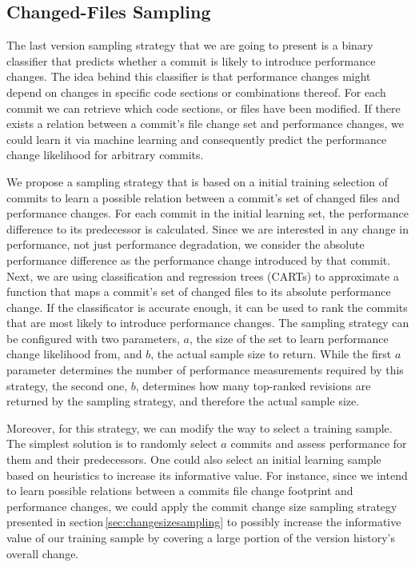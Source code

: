 \subsection{Changed-Files Sampling}\label{sec:changedfiles}
The last version sampling strategy that we are going to present is a binary
classifier that predicts whether a commit is likely to introduce performance
changes. The idea behind this classifier is that performance changes might
depend on changes in specific code sections or combinations thereof. For each
commit we can retrieve which code sections, or files have been modified. If
there exists a relation between a commit’s file change set and performance
changes, we could learn it via machine learning and consequently predict
the performance change likelihood for arbitrary commits.

We propose a sampling strategy that is based on a initial training selection of
commits to learn a possible relation between a commit’s set of changed files
and performance changes. For each commit in the initial learning set, the
performance difference to its predecessor is calculated. Since we are
interested in any change in performance, not just performance degradation, we
consider the absolute performance difference as the performance change introduced by that
commit. Next, we are using classification and regression trees (CARTs) to
approximate a function that maps a commit’s set of changed files to its
absolute performance change. If the classificator is accurate enough, it can be
used to rank the commits that are most likely to introduce performance
changes. The sampling strategy can be configured with two parameters, $a$, the
size of the set to learn performance change likelihood from, and $b$, the
actual sample size to return. While the first $a$ parameter determines the
number of performance measurements required by this strategy, the second one,
$b$, determines how many top-ranked revisions are returned by the sampling
strategy, and therefore the actual sample size.

Moreover, for this strategy, we can modify the way to select a training sample.
The simplest solution is to randomly select $a$ commits and assess performance
for them and their predecessors. One could also select an initial learning
sample based on heuristics to increase its informative value. For instance,
since we intend to learn possible relations between a commits file change
footprint and performance changes, we could apply the commit change size
sampling strategy presented in section\,\ref{sec:changesizesampling} to possibly
increase the informative value of our training sample by covering a large
portion of the version history's overall change.

